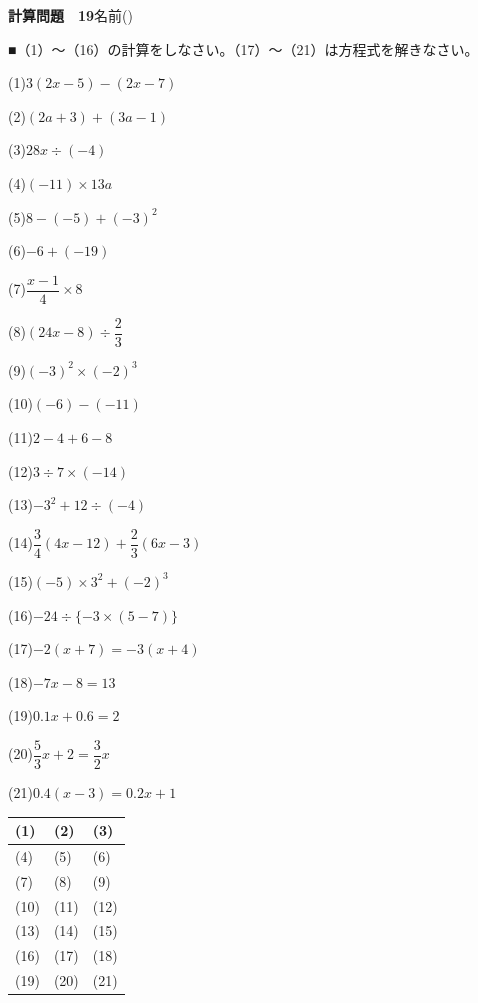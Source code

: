 \documentclass[a4paper,11pt]{ltjsarticle}
\newlength{\qcol}\setlength{\qcol}{0.47\textwidth}
\newlength{\qgap}
\newlength{\anscolw}\setlength{\anscolw}{0.30\textwidth}
\newlength{\ansh}
\newcommand{\Q}[2]{\parbox[t]{\qcol}{\raggedright (#1)\hspace{0.6em}$\displaystyle #2$}}
\newcommand{\QR}[4]{\Q{#1}{#2}\hfill\Q{#3}{#4}\par\vspace{\qgap}}
\newcommand{\anscell}[1]{\rule[-\ansdrop]{0pt}{\ansh}(#1)}
\newlength{\ansdrop}
\begin{document}
{\large\bfseries 計算問題　19}\hfill 名前(\underline{\hspace{32mm}})\par\vspace{3mm}
■（1）〜（16）の計算をしなさい。（17）〜（21）は方程式を解きなさい。\par\vspace{3mm}
\setlength{\qgap}{5.4mm}
\QR{1}{3(2x-5)-(2x-7)}{2}{(2a+3)+(3a-1)}
\QR{3}{28x\div(-4)}{4}{(-11)\times13a}
\QR{5}{8-(-5)+(-3)^2}{6}{-6+(-19)}
\QR{7}{\dfrac{x-1}{4}\times8}{8}{(24x-8)\div\dfrac{2}{3}}
\QR{9}{(-3)^2\times(-2)^3}{10}{(-6)-(-11)}
\QR{11}{2-4+6-8}{12}{3\div7\times(-14)}
\QR{13}{-3^2+12\div(-4)}{14}{\dfrac{3}{4}(4x-12)+\dfrac{2}{3}(6x-3)}
\QR{15}{(-5)\times3^2+(-2)^3}{16}{-24\div\{-3\times(5-7)\}}
\QR{17}{-2(x+7)=-3(x+4)}{18}{-7x-8=13}
\QR{19}{0.1x+0.6=2}{20}{\dfrac{5}{3}x+2=\dfrac{3}{2}x}
\vspace{1mm}
\Q{21}{0.4(x-3)=0.2x+1}\par\vspace{3mm}
\setlength{\ansh}{9.5mm}\setlength{\ansdrop}{6mm}%
\begin{center}\begin{tabular}{|p{\anscolw}|p{\anscolw}|p{\anscolw}|}\hline
\anscell{1} & \anscell{2} & \anscell{3} \\\hline
\anscell{4} & \anscell{5} & \anscell{6} \\\hline
\anscell{7} & \anscell{8} & \anscell{9} \\\hline
\anscell{10} & \anscell{11} & \anscell{12} \\\hline
\anscell{13} & \anscell{14} & \anscell{15} \\\hline
\anscell{16} & \anscell{17} & \anscell{18} \\\hline
\anscell{19} & \anscell{20} & \anscell{21} \\\hline
\end{tabular}\end{center}
\end{document}
